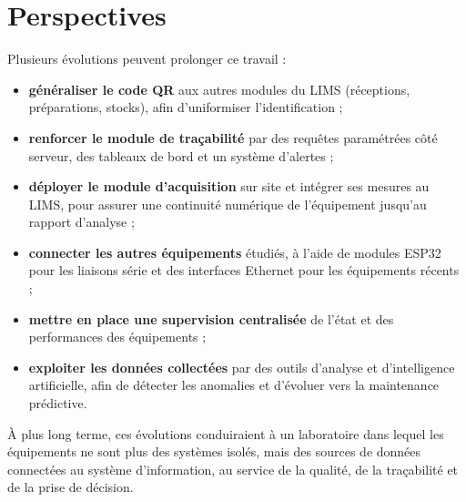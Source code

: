 \section*{Perspectives}

Plusieurs évolutions peuvent prolonger ce travail :
\begin{itemize}
    \item \textbf{généraliser le code \ac{QR}} aux autres modules du \ac{LIMS} (réceptions, préparations, stocks), afin d'uniformiser l'identification ;
    \item \textbf{renforcer le module de traçabilité} par des requêtes paramétrées côté serveur, des tableaux de bord et un système d'alertes ;
    \item \textbf{déployer le module d'acquisition} sur site et intégrer ses mesures au \ac{LIMS}, pour assurer une continuité numérique de l'équipement jusqu'au rapport d'analyse ;
    \item \textbf{connecter les autres équipements} étudiés, à l'aide de modules ESP32 pour les liaisons série et des interfaces Ethernet pour les équipements récents ;
    \item \textbf{mettre en place une supervision centralisée} de l'état et des performances des équipements ;
    \item \textbf{exploiter les données collectées} par des outils d'analyse et d'intelligence artificielle, afin de détecter les anomalies et d'évoluer vers la maintenance prédictive.
\end{itemize}

À plus long terme, ces évolutions conduiraient à un laboratoire dans lequel les équipements ne sont plus des systèmes isolés, mais des sources de données connectées au système d'information, au service de la qualité, de la traçabilité et de la prise de décision.
